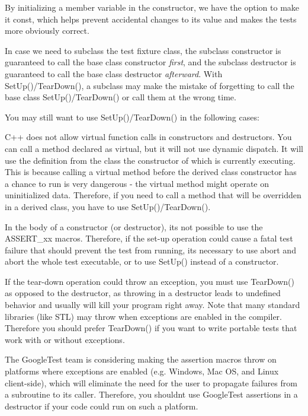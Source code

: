 \begin{DoxyItemize}
\item By initializing a member variable in the constructor, we have the option to make it {\ttfamily const}, which helps prevent accidental changes to its value and makes the tests more obviously correct.
\item In case we need to subclass the test fixture class, the subclass\textquotesingle{} constructor is guaranteed to call the base class\textquotesingle{} constructor {\itshape first}, and the subclass\textquotesingle{} destructor is guaranteed to call the base class\textquotesingle{} destructor {\itshape afterward}. With {\ttfamily Set\+Up()/\+Tear\+Down()}, a subclass may make the mistake of forgetting to call the base class\textquotesingle{} {\ttfamily Set\+Up()/\+Tear\+Down()} or call them at the wrong time.
\end{DoxyItemize}

You may still want to use {\ttfamily Set\+Up()/\+Tear\+Down()} in the following cases\+:


\begin{DoxyItemize}
\item C++ does not allow virtual function calls in constructors and destructors. You can call a method declared as virtual, but it will not use dynamic dispatch. It will use the definition from the class the constructor of which is currently executing. This is because calling a virtual method before the derived class constructor has a chance to run is very dangerous -\/ the virtual method might operate on uninitialized data. Therefore, if you need to call a method that will be overridden in a derived class, you have to use {\ttfamily Set\+Up()/\+Tear\+Down()}.
\item In the body of a constructor (or destructor), it\textquotesingle{}s not possible to use the {\ttfamily A\+S\+S\+E\+R\+T\+\_\+xx} macros. Therefore, if the set-\/up operation could cause a fatal test failure that should prevent the test from running, it\textquotesingle{}s necessary to use {\ttfamily abort} and abort the whole test executable, or to use {\ttfamily Set\+Up()} instead of a constructor.
\item If the tear-\/down operation could throw an exception, you must use {\ttfamily Tear\+Down()} as opposed to the destructor, as throwing in a destructor leads to undefined behavior and usually will kill your program right away. Note that many standard libraries (like S\+TL) may throw when exceptions are enabled in the compiler. Therefore you should prefer {\ttfamily Tear\+Down()} if you want to write portable tests that work with or without exceptions.
\item The Google\+Test team is considering making the assertion macros throw on platforms where exceptions are enabled (e.\+g. Windows, Mac OS, and Linux client-\/side), which will eliminate the need for the user to propagate failures from a subroutine to its caller. Therefore, you shouldn\textquotesingle{}t use Google\+Test assertions in a destructor if your code could run on such a platform.
\end{DoxyItemize}

